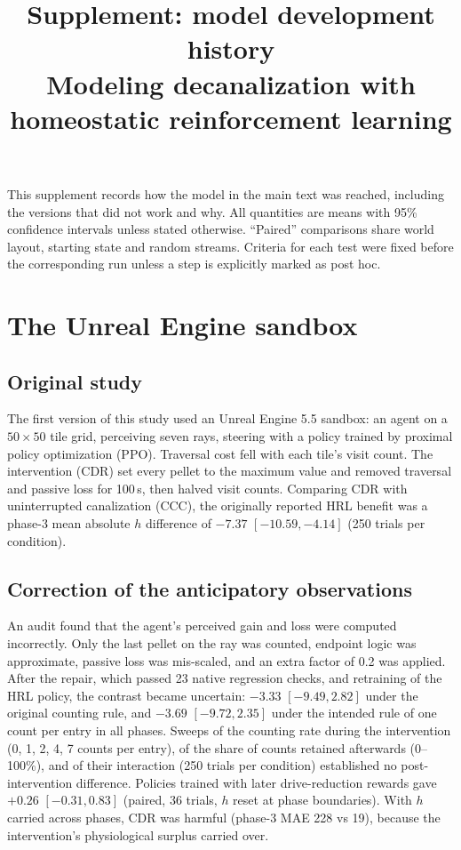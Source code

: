 \documentclass[11pt]{article}
\title{Supplement: model development history\\\large Modeling decanalization with homeostatic reinforcement learning}
\date{}
\begin{document}
\maketitle

\noindent This supplement records how the model in the main text was reached, including the versions that did not work and why. All quantities are means with 95\% confidence intervals unless stated otherwise. ``Paired'' comparisons share world layout, starting state and random streams. Criteria for each test were fixed before the corresponding run unless a step is explicitly marked as post hoc.

\section{The Unreal Engine sandbox}

\subsection{Original study}

The first version of this study used an Unreal Engine 5.5 sandbox: an agent on a $50\times50$ tile grid, perceiving seven rays, steering with a policy trained by proximal policy optimization (PPO). Traversal cost fell with each tile's visit count. The intervention (CDR) set every pellet to the maximum value and removed traversal and passive loss for 100\,s, then halved visit counts. Comparing CDR with uninterrupted canalization (CCC), the originally reported HRL benefit was a phase-3 mean absolute $h$ difference of $-7.37$ $[-10.59, -4.14]$ (250 trials per condition).

\subsection{Correction of the anticipatory observations}

An audit found that the agent's perceived gain and loss were computed incorrectly. Only the last pellet on the ray was counted, endpoint logic was approximate, passive loss was mis-scaled, and an extra factor of 0.2 was applied. After the repair, which passed 23 native regression checks, and retraining of the HRL policy, the contrast became uncertain: $-3.33$ $[-9.49, 2.82]$ under the original counting rule, and $-3.69$ $[-9.72, 2.35]$ under the intended rule of one count per entry in all phases. Sweeps of the counting rate during the intervention (0, 1, 2, 4, 7 counts per entry), of the share of counts retained afterwards (0--100\%), and of their interaction (250 trials per condition) established no post-intervention difference. Policies trained with later drive-reduction rewards gave $+0.26$ $[-0.31, 0.83]$ (paired, 36 trials, $h$ reset at phase boundaries). With $h$ carried across phases, CDR was harmful (phase-3 MAE 228 vs 19), because the intervention's physiological surplus carried over.
\end{document}

